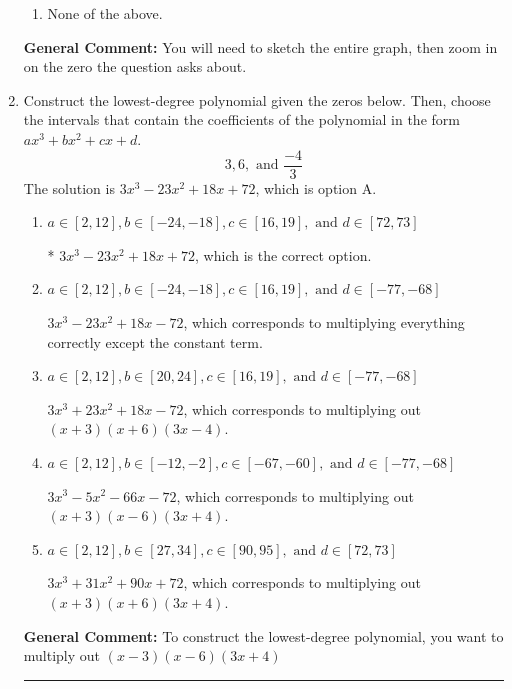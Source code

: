 \documentclass{extbook}[14pt]
\newcommand{\litem}[1]{\item #1

\rule{\textwidth}{0.4pt}}
\begin{document}
\begin{enumerate}
{\begin{enumerate}[label=\Alph*.]
\item None of the above.\end{enumerate}
\textbf{General Comment:} You will need to sketch the entire graph, then zoom in on the zero the question asks about.
}
\litem{
Construct the lowest-degree polynomial given the zeros below. Then, choose the intervals that contain the coefficients of the polynomial in the form $ax^3+bx^2+cx+d$.
\[ 3, 6, \text{ and } \frac{-4}{3} \]The solution is \( 3x^{3} -23 x^{2} +18 x + 72 \), which is option A.\begin{enumerate}[label=\Alph*.]
\item \( a \in [2, 12], b \in [-24, -18], c \in [16, 19], \text{ and } d \in [72, 73] \)

* $3x^{3} -23 x^{2} +18 x + 72$, which is the correct option.
\item \( a \in [2, 12], b \in [-24, -18], c \in [16, 19], \text{ and } d \in [-77, -68] \)

$3x^{3} -23 x^{2} +18 x -72$, which corresponds to multiplying everything correctly except the constant term.
\item \( a \in [2, 12], b \in [20, 24], c \in [16, 19], \text{ and } d \in [-77, -68] \)

$3x^{3} +23 x^{2} +18 x -72$, which corresponds to multiplying out $(x + 3)(x + 6)(3x -4)$.
\item \( a \in [2, 12], b \in [-12, -2], c \in [-67, -60], \text{ and } d \in [-77, -68] \)

$3x^{3} -5 x^{2} -66 x -72$, which corresponds to multiplying out $(x + 3)(x -6)(3x + 4)$.
\item \( a \in [2, 12], b \in [27, 34], c \in [90, 95], \text{ and } d \in [72, 73] \)

$3x^{3} +31 x^{2} +90 x + 72$, which corresponds to multiplying out $(x + 3)(x + 6)(3x + 4)$.
\end{enumerate}

\textbf{General Comment:} To construct the lowest-degree polynomial, you want to multiply out $(x -3)(x -6)(3x + 4)$
}
\end{enumerate}
\end{document}
